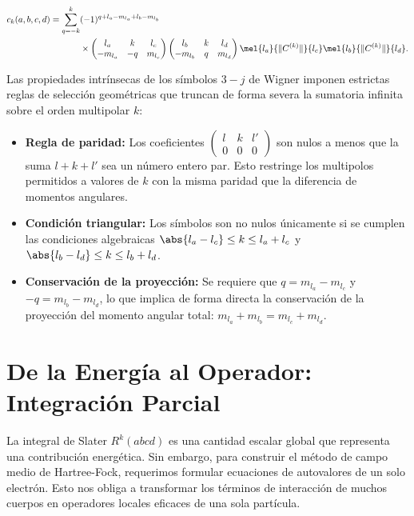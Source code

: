 \begin{align}
  c_k(a,b,c,d) = \sum_{q=-k}^k & (-1)^{q + l_a - m_{l_a} + l_b - m_{l_b}} \nonumber \\
  & \times \begin{pmatrix} l_a & k & l_c \\ -m_{l_a} & -q & m_{l_c} \end{pmatrix} \begin{pmatrix} l_b & k & l_d \\ -m_{l_b} & q & m_{l_d} \end{pmatrix} \mel{l_a}{\|C^{(k)}\|}{l_c}\mel{l_b}{\|C^{(k)}\|}{l_d}.
\end{align}

Las propiedades intrínsecas de los símbolos \( 3-j \) de Wigner imponen estrictas reglas de selección geométricas que truncan de forma severa la sumatoria infinita sobre el orden multipolar \( k \):

\begin{itemize}
\item \textbf{Regla de paridad:} Los coeficientes \( \begin{pmatrix} l & k & l' \\ 0 & 0 & 0 \end{pmatrix} \) son nulos a menos que la suma \( l + k + l' \) sea un número entero par. Esto restringe los multipolos permitidos a valores de \( k \) con la misma paridad que la diferencia de momentos angulares.
\item \textbf{Condición triangular:} Los símbolos son no nulos únicamente si se cumplen las condiciones algebraicas \( \abs{l_a - l_c} \le k \le l_a + l_c \) y \( \abs{l_b - l_d} \le k \le l_b + l_d \).
\item \textbf{Conservación de la proyección:} Se requiere que \( q = m_{l_a} - m_{l_c} \) y \( -q = m_{l_b} - m_{l_d} \), lo que implica de forma directa la conservación de la proyección del momento angular total: \( m_{l_a} + m_{l_b} = m_{l_c} + m_{l_d} \).
\end{itemize}

\section{De la Energía al Operador: Integración Parcial}

La integral de Slater \( R^k(abcd) \) es una cantidad escalar global que representa una contribución energética. Sin embargo, para construir el método de campo medio de Hartree-Fock, requerimos formular ecuaciones de autovalores de un solo electrón. Esto nos obliga a transformar los términos de interacción de muchos cuerpos en operadores locales eficaces de una sola partícula.

